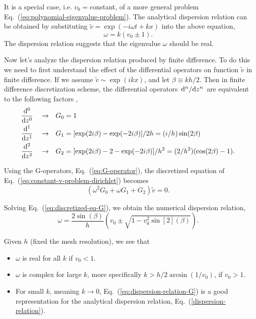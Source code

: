 It is a special case, i.e. $v_0=$constant, of a more general problem Eq.~(\ref{eq:polynomial-eigenvalue-problem}). The analytical dispersion relation can be obtained by substituting $\tilde{v} = \exp(-i\omega t + kx)$ into the above equation,
\begin{equation} \label{dispersion-relation}
	\omega = k(v_0 \pm 1).
\end{equation}
The dispersion relation suggests that the eigenvalue $\omega$ should be real.

Now let's analyze the dispersion relation produced by finite difference. To do this we need to first understand the effect of the differential operators on function $\tilde{v}$ in finite difference. If we assume $\tilde{v}\sim \exp(ikx)$, and let $\beta\equiv kh/2$. Then in finite difference discretization scheme, the differential operators $\dv*[n]{z}$ are equivalent to the following factors \cite{llobet_spectral_1990},
\begin{equation}
	\begin{aligned}
		\dv[0]{z} \quad \to \quad & G_0 = 1                                                               \\
		\dv[1]{z} \quad \to \quad & G_1 = [\exp(2i\beta)-\exp(-2i\beta)]/2h = (i/h)\sin(2\beta)           \\
		\dv[2]{z} \quad \to \quad & G_2 = [\exp(2i\beta)-2-\exp(-2i\beta)]/h^2 = (2/h^2)(\cos(2\beta)-1).
	\end{aligned}
	\label{eq:G-operator}
\end{equation}

Using the G-operators, Eq.~(\ref{eq:G-operator}), the discretized equation of Eq.~(\ref{eq:constant-v-problem-dirichlet}) becomes
\begin{equation} \label{eq:discretized-eq-G}
	(\omega^2G_0 + \omega G_1 + G_2)\tilde{v} = 0.
\end{equation}

Solving Eq.~(\ref{eq:discretized-eq-G}), we obtain the numerical dispersion relation,
\begin{equation}
	\omega = \frac{2\sin(\beta)}{h}\left(v_0 \pm \sqrt{1 - v_0^2\sin[2](\beta)}\right).
	\label{eq:dispersion-relation-G}
\end{equation}

Given $h$ (fixed the mesh resolution), we see that
\begin{itemize}
	\item $\omega$ is real for all $k$ if $v_0 < 1$.
	\item $\omega$ is complex for large $k$, more specifically $k>h/2\arcsin(1/v_0)$, if $v_0 > 1$.
	\item For small $k$, meaning $k\to 0$, Eq.~(\ref{eq:dispersion-relation-G}) is a good representation for the analytical dispersion relation, Eq.~(\ref{dispersion-relation}).
\end{itemize}

